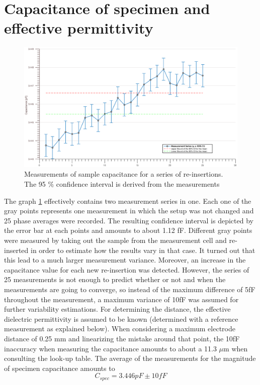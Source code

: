 \section{Capacitance of specimen and effective permittivity}
\label{effective}

\begin{figure}[ht]
	\centering
	\includegraphics[width=\textwidth]{figures/Results/Capacitance_Measure/capacitanceplot.eps}		
	\caption[Kurze Abbildungsbeschreibung]{Measurements of sample capacitance for a series of re-insertions. The 95 $\%$ confidence interval is derived from the measurements} 
	\label{fig.messreihe}
\end{figure}

The graph \ref{fig.messreihe} effectively contains two measurement series in one. Each one of the gray points represents one measurement in which
the setup was not changed and 25 phase averages were recorded. The resulting confidence interval is depicted by the error bar at each points
and amounts to about 1.12 fF.
\newline
Different gray points were measured by taking out the sample from the measurement cell and re-inserted in order to estimate how the results vary in that case.
It turned out that this lead to a much larger measurement variance. Moreover, an increase in the capacitance value for each new re-insertion was detected.
However, the series of 25 measurements is not enough to predict whether or not and when the measurements are going to converge, so instead of the maximum difference of
5fF throughout the measurement, a maximum variance of 10fF was assumed for further variability estimations. 
\newline
For determining the distance, the 
effective dielectric permittivity is assumed to be known (determined with a reference measurement as explained below). When
considering a maximum electrode distance of 0.25 mm and linearizing the mistake around that point, the 10fF inaccuracy
when measuring the capacitance amounts to about a 11.3 $\mu$m when consulting the look-up table.
The average of the measurements for the magnitude of specimen capacitance amounts to
\begin{equation}
 C_{spec}=3.446pF \pm 10fF
\end{equation}

